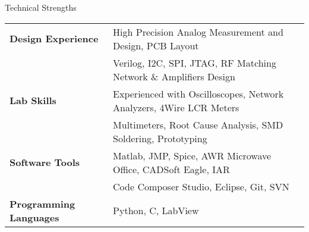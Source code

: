 \documentclass{resume} %
\begin{document}

\begin{rSection}{Technical Strengths}

\begin{tabular}{ @{} >{\bfseries}l @{\hspace{6ex}} l }
Design Experience & High Precision Analog Measurement and Design, PCB Layout \\
& Verilog, I2C, SPI, JTAG, RF Matching Network \& Amplifiers Design\smallskip \\

Lab Skills & Experienced with Oscilloscopes, Network Analyzers, 4Wire LCR Meters\\
& Multimeters, Root Cause Analysis, SMD Soldering, Prototyping \smallskip \\

Software Tools & Matlab, JMP, Spice, AWR Microwave Office, CADSoft Eagle, IAR\\ 
 & Code Composer Studio, Eclipse, Git, SVN \smallskip \\

Programming Languages & Python, C, LabView \smallskip \\ 

\end{tabular}

\end{rSection}
\smallskip
\end{document}
